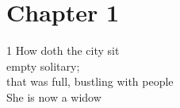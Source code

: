 \documentclass{article}
\begin{document}
\section*{Chapter 1}

1 How doth the city sit\\
empty solitary;\\
that was full, bustling with people\\
She is now a widow\\
\end{document}

